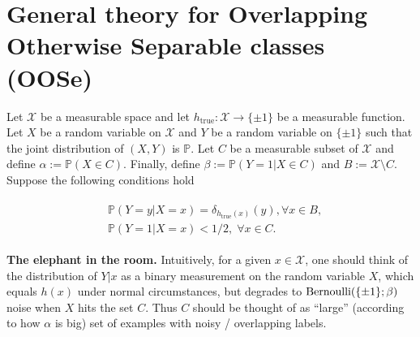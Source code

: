 \section{General theory for Overlapping Otherwise Separable classes (OOSe)}
Let $\mathcal X$ be a measurable space
and let $h_{\text{true}}:\mathcal X \rightarrow \{\pm 1\}$ be a measurable
function. Let $X$ be a random variable on $\mathcal X$ and $Y$ be a random
variable on $\{\pm 1\}$ such that the joint distribution of $(X,Y)$ is $\mathbb
P$. Let $C$ be a measurable subset of $\mathcal X$ and define
$\alpha:=\mathbb{P}(X \in C)$. Finally, define $\beta := \mathbb P(Y=1|X\in C)$
and $B:=\mathcal X\setminus C$. Suppose the following conditions hold
\begin{assumption}
\begin{eqnarray}
  \begin{split}
    &\mathbb P(Y=y|X=x)=\delta_{h_{\text{true}}(x)}(y), \forall x \in B,\\    
    &\mathbb P(Y=1|X=x) < 1/2,\;\forall x \in C.
  \end{split}
\end{eqnarray}
\label{thm:overlap_assumption}
\end{assumption}
\begin{mdframed}
  \textbf{The elephant in the room.}
  Intuitively, for a given $x \in \mathcal X$, one should think of the
distribution of $Y|x$ as a binary measurement on the random variable $X$, which
equals $h(x)$ under normal circumstances, but degrades to $\operatorname{Bernoulli}(\{\pm
1\};\beta)$ noise when $X$ hits the set $C$. Thus $C$ should be thought of as
``large'' (according to how $\alpha$ is big) set of examples with noisy /
overlapping labels.
\end{mdframed}

